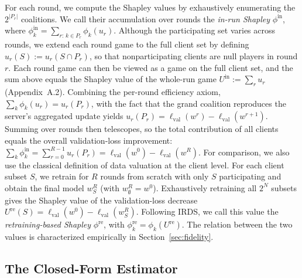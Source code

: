 \documentclass[letterpaper]{article} %
\theoremstyle{definition} %
\newcommand{\lval}{\ell_{\mathrm{val}}} %
\begin{document}
For each round, we compute the Shapley values by exhaustively enumerating
the $2^{|P_r|}$ coalitions. We call their accumulation over rounds the
\emph{in-run Shapley} $\phi^{\mathrm{in}}$, where
$\phi_k^{\mathrm{in}}=\sum_{r:\,k\in P_r}\phi_k(u_r)$.
Although the participating set varies across rounds, we extend each round
game to the full client set by defining
$u_r(S) := u_r(S \cap P_r)$, so that nonparticipating clients are null
players in round $r$. 
Each round game can then be viewed as a game on
the full client set, and the sum above equals the Shapley value of the
whole-run game $U^{\mathrm{in}} := \sum_r u_r$ (Appendix~A.2). Combining the per-round efficiency axiom,
$\sum_k \phi_k(u_r) = u_r(P_r)$, with the fact that the grand coalition
reproduces the server's aggregated update yields
$u_r(P_r) = \lval(w^r) - \lval(w^{r+1})$. Summing over rounds then telescopes,
so the total contribution of all clients equals the overall validation-loss
improvement:
$
\sum_k \phi_k^{\mathrm{in}}
=
\sum_{r=0}^{R-1} u_r(P_r)
=
\lval(w^0)-\lval(w^R).$ 
For comparison, we also use the classical definition of data valuation at the
client level. For each client subset $S$, we retrain for $R$ rounds from
scratch with only $S$ participating and obtain the final model $w_S^R$ (with
$w_\emptyset^R = w^0$). Exhaustively retraining all $2^N$ subsets gives the
Shapley value of the validation-loss decrease
$U^{\mathrm{re}}(S) = \lval(w^0) - \lval(w_S^R)$. Following IRDS, we call this
value the \emph{retraining-based Shapley} $\phi^{\mathrm{re}}$, with
$\phi_k^{\mathrm{re}} = \phi_k(U^{\mathrm{re}})$. The relation between the two
values is characterized empirically in Section~\ref{sec:fidelity}.

\subsection{The Closed-Form Estimator}
\label{sec:estimator}
\end{document}
